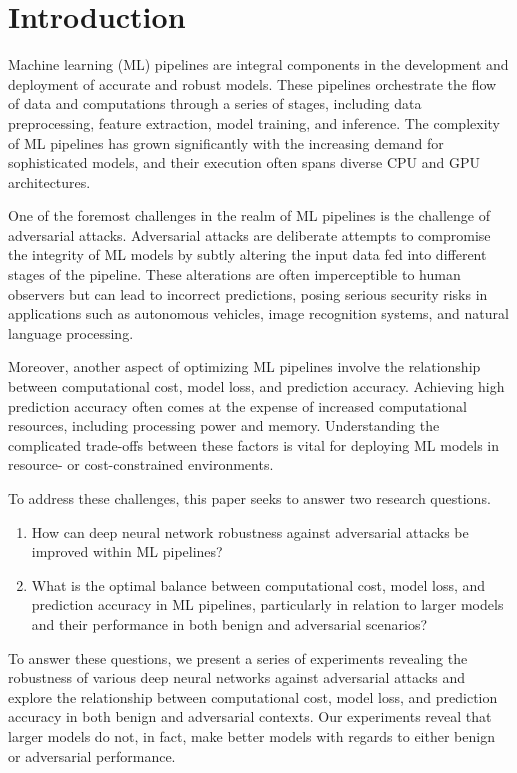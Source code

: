\section{Introduction}

Machine learning (ML) pipelines are integral components in the development and deployment of accurate and robust models. These pipelines orchestrate the flow of data and computations through a series of stages, including data preprocessing, feature extraction, model training, and inference. The complexity of ML pipelines has grown significantly with the increasing demand for sophisticated models, and their execution often spans diverse CPU and GPU architectures.

One of the foremost challenges in the realm of ML pipelines is the challenge of adversarial attacks. Adversarial attacks are deliberate attempts to compromise the integrity of ML models by subtly altering the input data fed into different stages of the pipeline. These alterations are often imperceptible to human observers but can lead to incorrect predictions, posing serious security risks in applications such as autonomous vehicles, image recognition systems, and natural language processing.

Moreover, another aspect of optimizing ML pipelines involve the relationship between computational cost, model loss, and prediction accuracy. Achieving high prediction accuracy often comes at the expense of increased computational resources, including processing power and memory. Understanding the complicated trade-offs between these factors is vital for deploying ML models in resource- or cost-constrained environments.

To address these challenges, this paper seeks to answer two research questions.

\begin{enumerate}
    \item How can deep neural network robustness against adversarial attacks be improved within ML pipelines?
    \item What is the optimal balance between computational cost, model loss, and prediction accuracy in ML pipelines, particularly in relation to larger models and their performance in both benign and adversarial scenarios?
\end{enumerate}

To answer these questions, we present a series of experiments revealing the robustness of various deep neural networks against adversarial attacks and explore the relationship between computational cost, model loss, and  prediction accuracy in both benign and adversarial contexts. Our experiments reveal that larger models do not, in fact, make better models with regards to either benign or adversarial performance. 

